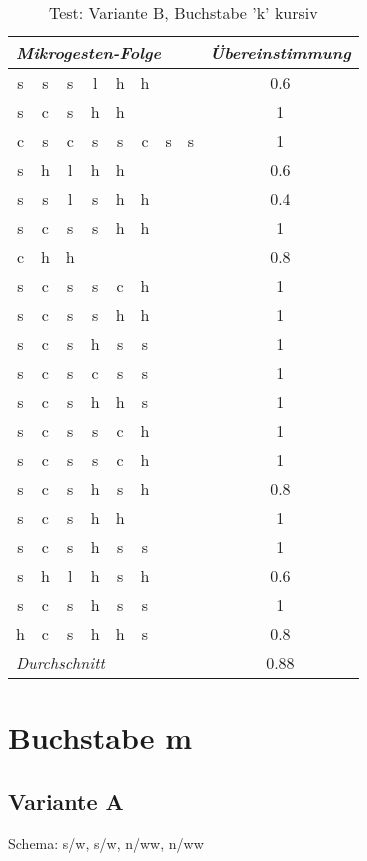 \begin{table}[!h]
  \begin{center}
    \begin{tabular}{ c c c c c c c c | c }
\multicolumn{8}{l}{\emph{Mikrogesten-Folge}}&\emph{Übereinstimmung} \\ \hline
s&s&s&l&h&h&&&0.6\\ \hline
s&c&s&h&h&&&&1\\ \hline
c&s&c&s&s&c&s&s&1\\ \hline
s&h&l&h&h&&&&0.6\\ \hline
s&s&l&s&h&h&&&0.4\\ \hline
s&c&s&s&h&h&&&1\\ \hline
c&h&h&&&&&&0.8\\ \hline
s&c&s&s&c&h&&&1\\ \hline
s&c&s&s&h&h&&&1\\ \hline
s&c&s&h&s&s&&&1\\ \hline
s&c&s&c&s&s&&&1\\ \hline
s&c&s&h&h&s&&&1\\ \hline
s&c&s&s&c&h&&&1\\ \hline
s&c&s&s&c&h&&&1\\ \hline
s&c&s&h&s&h&&&0.8\\ \hline
s&c&s&h&h&&&&1\\ \hline
s&c&s&h&s&s&&&1\\ \hline
s&h&l&h&s&h&&&0.6\\ \hline
s&c&s&h&s&s&&&1\\ \hline
h&c&s&h&h&s&&&0.8\\ \hline
\multicolumn{8}{l|}{\emph{Durchschnitt}}&  0.88 \\ \hline
    \end{tabular}
  \end{center}
  \caption{Test: Variante B, Buchstabe 'k' kursiv}
  \label{test_b_k}
\end{table}



\section{Buchstabe m}
\subsection{Variante A}
Schema: s/w, s/w, n/ww, n/ww


